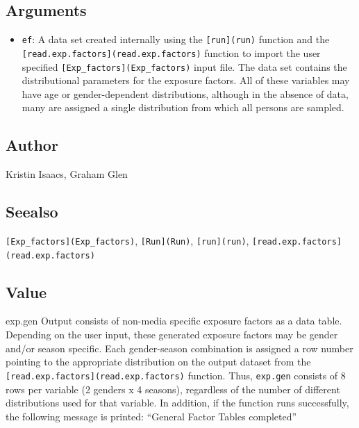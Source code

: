\documentclass[
]{article}
\providecommand{\tightlist}{%
  \setlength{\itemsep}{0pt}\setlength{\parskip}{0pt}}
\begin{document}
\hypertarget{arguments-21}{%
\subsection{Arguments}\label{arguments-21}}

\begin{itemize}
\tightlist
\item
  \texttt{ef}: A data set created internally using the
  \texttt{{[}run{]}(run)} function and the
  \texttt{{[}read.exp.factors{]}(read.exp.factors)} function to import
  the user specified \texttt{{[}Exp\_factors{]}(Exp\_factors)} input
  file. The data set contains the distributional parameters for the
  exposure factors. All of these variables may have age or
  gender-dependent distributions, although in the absence of data, many
  are assigned a single distribution from which all persons are sampled.
\end{itemize}

\hypertarget{author-18}{%
\subsection{Author}\label{author-18}}

Kristin Isaacs, Graham Glen

\hypertarget{seealso-14}{%
\subsection{Seealso}\label{seealso-14}}

\texttt{{[}Exp\_factors{]}(Exp\_factors)}, \texttt{{[}Run{]}(Run)},
\texttt{{[}run{]}(run)},
\texttt{{[}read.exp.factors{]}(read.exp.factors)}

\hypertarget{value-19}{%
\subsection{Value}\label{value-19}}

exp.gen Output consists of non-media specific exposure factors as a data
table. Depending on the user input, these generated exposure factors may
be gender and/or season specific. Each gender-season combination is
assigned a row number pointing to the appropriate distribution on the
output dataset from the
\texttt{{[}read.exp.factors{]}(read.exp.factors)} function. Thus,
\texttt{exp.gen} consists of 8 rows per variable (2 genders x 4
seasons), regardless of the number of different distributions used for
that variable. In addition, if the function runs successfully, the
following message is printed: ``General Factor Tables completed''
\end{document}
